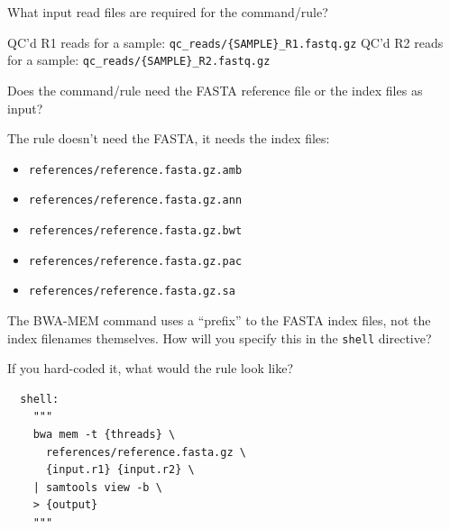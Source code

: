 \begin{questions}

What input read files are required for the command/rule?

\begin{answer}

QC'd R1 reads for a sample: \texttt{qc\_reads/\{SAMPLE\}\_R1.fastq.gz}
QC'd R2 reads for a sample: \texttt{qc\_reads/\{SAMPLE\}\_R2.fastq.gz}

\end{answer}

Does the command/rule need the FASTA reference file or the index files as input?

\begin{answer}

The rule doesn't need the FASTA, it needs the index files:

\begin{itemize}
  \item \texttt{references/reference.fasta.gz.amb}
  \item \texttt{references/reference.fasta.gz.ann}
  \item \texttt{references/reference.fasta.gz.bwt}
  \item \texttt{references/reference.fasta.gz.pac}
  \item \texttt{references/reference.fasta.gz.sa}
\end{itemize}

\end{answer}

The BWA-MEM command uses a ``prefix'' to the FASTA index files, not the index filenames themselves.
How will you specify this in the \texttt{shell} directive?

If you hard-coded it, what would the rule look like?

\begin{answer}

\begin{lstlisting}
  shell:
    """
    bwa mem -t {threads} \
      references/reference.fasta.gz \
      {input.r1} {input.r2} \
    | samtools view -b \
    > {output}
    """
\end{lstlisting}

\end{answer}

\end{questions}

